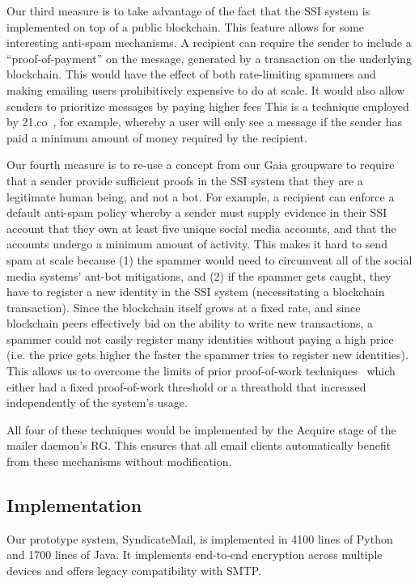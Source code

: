 Our third measure is to take advantage of the fact that the SSI system is implemented on top of
a public blockchain.  This feature allows for some interesting anti-spam mechanisms.  A recipient can require the sender
to include a ``proof-of-payment'' on the message, generated by a transaction on the
underlying blockchain.  This would have the effect of both rate-limiting
spammers and making emailing users prohibitively expensive to do at scale.  It
would also allow senders to prioritize messages by paying higher fees This
is a technique employed by 21.co~\cite{21co-messaging}, for example, whereby a user will only see a
message if the sender has paid a minimum amount of money required by the
recipient.

Our fourth measure is to re-use a concept from our Gaia groupware to require
that a sender provide sufficient proofs in the SSI system that they are a
legitimate human being, and not a bot.  For example, a recipient can enforce a
default anti-spam policy whereby a sender must supply evidence in their SSI
account that they own at least five unique social media accounts, and that the
accounts undergo a minimum amount of activity.  This makes it hard to send
spam at scale because (1) the spammer would need to circumvent all of the social
media systems' ant-bot mitigations, and (2) if the spammer gets caught, they
have to register a new identity in the SSI system (necessitating a blockchain
transaction).  Since the blockchain itself grows at a fixed rate, and since
blockchain peers effectively bid on the ability to write new transactions, a
spammer could not easily register many identities without paying a high price
(i.e. the price gets higher the faster the spammer tries to register new
identities).  This allows us to overcome the limits of prior proof-of-work
techniques~\cite{anti-spam-proof-of-work} which either had a fixed proof-of-work
threshold or a threathold that increased independently of the system's usage.

All four of these techniques would be implemented by the Acquire stage of the
mailer daemon's RG.  This ensures that all email clients automatically benefit
from these mechanisms without modification.

\subsection{Implementation}

Our prototype system, SyndicateMail, is implemented in 4100 lines of Python and
1700 lines of Java.  It implements end-to-end encryption across multiple devices
and offers legacy compatibility with SMTP.

